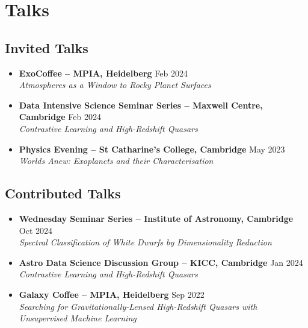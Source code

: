 \documentclass[a4paper,10pt]{article}
\begin{document}
\section*{Talks}

\subsection{Invited Talks}

\begin{itemize}
\vspace{1ex}
\item \textbf{ExoCoffee -- MPIA, Heidelberg} \hfill Feb 2024\\
\textit{Atmospheres as a Window to Rocky Planet Surfaces}

\item \textbf{Data Intensive Science Seminar Series -- Maxwell Centre, Cambridge} \hfill Feb 2024\\
\textit{Contrastive Learning and High-Redshift Quasars}

\item \textbf{Physics Evening -- St Catharine's College, Cambridge} \hfill May 2023\\
\textit{Worlds Anew: Exoplanets and their Characterisation}
\end{itemize}

\subsection{Contributed Talks}

\begin{itemize}
\vspace{1ex}

\item \textbf{Wednesday Seminar Series -- Institute of Astronomy, Cambridge} \hfill Oct 2024\\
\textit{Spectral Classification of White Dwarfs by Dimensionality Reduction}

\item \textbf{Astro Data Science Discussion Group -- KICC, Cambridge} \hfill Jan 2024\\
\textit{Contrastive Learning and High-Redshift Quasars}

\item \textbf{Galaxy Coffee -- MPIA, Heidelberg} \hfill Sep 2022\\
\textit{Searching for Gravitationally-Lensed High-Redshift Quasars with Unsupervised Machine Learning}

\end{itemize}
\end{document}
